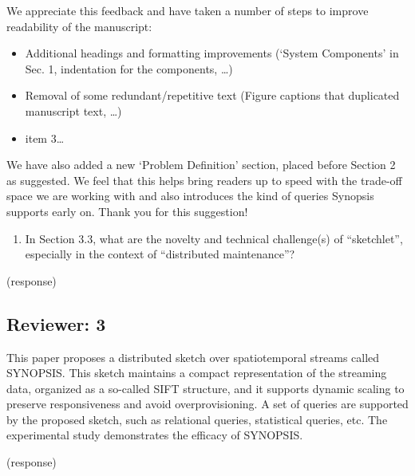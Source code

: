 \documentclass{article}
\begin{document}
\begin{tcolorbox}
We appreciate this feedback and have taken a number of steps to improve
readability of the manuscript:

\begin{itemize}
\item
  Additional headings and formatting improvements (`System Components'
  in Sec. 1, indentation for the components, \ldots{})
\item
  Removal of some redundant/repetitive text (Figure captions that
  duplicated manuscript text, \ldots{})
\item
  item 3\ldots{}
\end{itemize}

We have also added a new `Problem Definition' section, placed before
Section 2 as suggested. We feel that this helps bring readers up to
speed with the trade-off space we are working with and also introduces
the kind of queries Synopsis supports early on. Thank you for this
suggestion!
\end{tcolorbox}

\begin{enumerate}
\def\labelenumi{(\arabic{enumi})}
\setcounter{enumi}{2}
\item
  In Section 3.3, what are the novelty and technical challenge(s) of
  ``sketchlet'', especially in the context of ``distributed
  maintenance''?
\end{enumerate}

\begin{tcolorbox}
(response)
\end{tcolorbox}

\subsection*{Reviewer: 3}\label{reviewer-3}

This paper proposes a distributed sketch over spatiotemporal streams
called SYNOPSIS. This sketch maintains a compact representation of the
streaming data, organized as a so-called SIFT structure, and it supports
dynamic scaling to preserve responsiveness and avoid overprovisioning. A
set of queries are supported by the proposed sketch, such as relational
queries, statistical queries, etc. The experimental study demonstrates
the efficacy of SYNOPSIS.

\begin{tcolorbox}
(response)
\end{tcolorbox}
\end{document}
